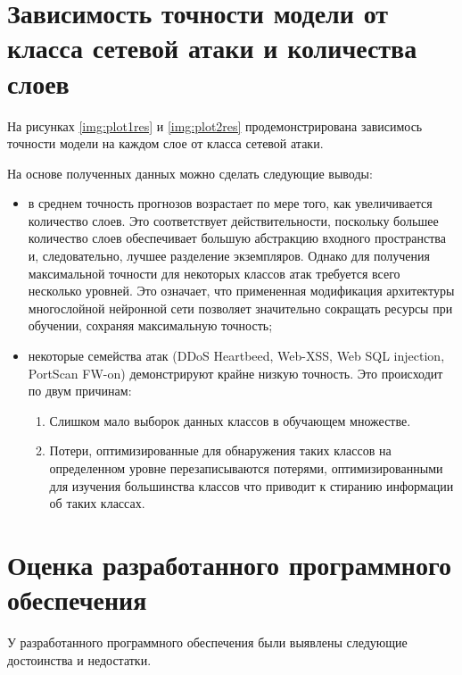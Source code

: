 
\section{Зависимость точности модели от класса сетевой атаки и количества слоев}
На рисунках \ref*{img:plot1res} и \ref*{img:plot2res} продемонстрирована зависимось точности модели на каждом слое от класса сетевой атаки.




На основе полученных данных можно сделать следующие выводы:

\begin{itemize}
    \item в среднем точность прогнозов возрастает
    по мере того, как увеличивается количество слоев. Это соответствует действительности, 
    поскольку большее количество слоев обеспечивает большую абстракцию
    входного пространства и, следовательно, лучшее разделение экземпляров. Однако для получения максимальной
    точности для некоторых классов атак требуется всего несколько уровней. Это означает, что примененная модификация архитектуры 
    многослойной нейронной сети позволяет 
    значительно сокращать ресурсы при обучении, сохраняя максимальную точность;
    \item некоторые семейства атак (DDoS Heartbeed, Web-XSS, Web SQL injection, PortScan FW-on) демонстрируют крайне низкую точность. Это происходит по двум причинам:
        \begin{enumerate}
            \item Слишком мало выборок данных классов в обучающем множестве.
            \item Потери, оптимизированные для обнаружения таких классов на определенном уровне
                    перезаписываются потерями, оптимизированными для изучения большинства классов что приводит к стиранию информации об таких классах.
        \end{enumerate}
\end{itemize}

\section{Оценка разработанного программного обеспечения}
У разработанного программного обеспечения были выявлены следующие
достоинства и недостатки.

